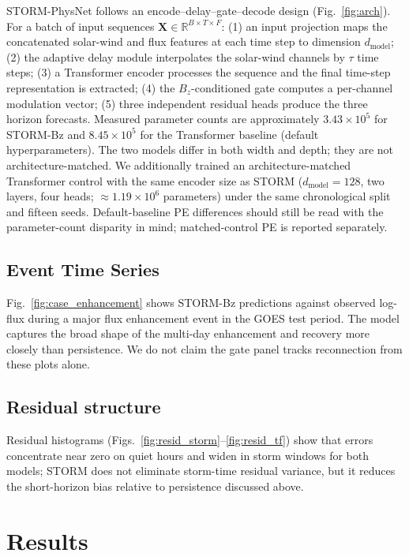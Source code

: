 \documentclass{ieeeaccess}
\begin{document}
STORM-PhysNet follows an encode--delay--gate--decode design
(Fig.~\ref{fig:arch}). For a batch of input sequences
\(\mathbf{X}\in\mathbb{R}^{B\times T\times F}\):
(1) an input projection maps the concatenated solar-wind and flux features at each
time step to dimension \(d_{\mathrm{model}}\);
(2) the adaptive delay module interpolates the solar-wind channels by \(\tau\)
time steps;
(3) a Transformer encoder processes the sequence and the final time-step
representation is extracted;
(4) the \(B_z\)-conditioned gate computes a per-channel modulation vector;
(5) three independent residual heads produce the three horizon forecasts.
Measured parameter counts are approximately $3.43\times10^{5}$ for
STORM-Bz and $8.45\times10^{5}$ for the Transformer baseline
(default hyperparameters). The two models differ in both width and depth;
they are not architecture-matched. We additionally trained an architecture-matched
Transformer control with the same encoder size as STORM
($d_{\mathrm{model}}=128$, two layers, four heads;
$\approx1.19\times10^{6}$ parameters) under the same chronological split and
fifteen seeds. Default-baseline PE differences should still be read with the
parameter-count disparity in mind; matched-control PE is reported separately.


\subsection{Event Time Series}
Fig.~\ref{fig:case_enhancement} shows STORM-Bz predictions against observed log-flux
during a major flux enhancement event in the GOES test period. The model captures
the broad shape of the multi-day enhancement and recovery more closely than persistence. We do not claim the gate panel tracks reconnection from these plots alone.



\subsection{Residual structure}
Residual histograms (Figs.~\ref{fig:resid_storm}--\ref{fig:resid_tf}) show
that errors concentrate near zero on quiet hours and widen in storm windows
for both models; STORM does not eliminate storm-time residual variance, but
it reduces the short-horizon bias relative to persistence discussed above.

\section{Results}
\label{sec:results}
\end{document}

